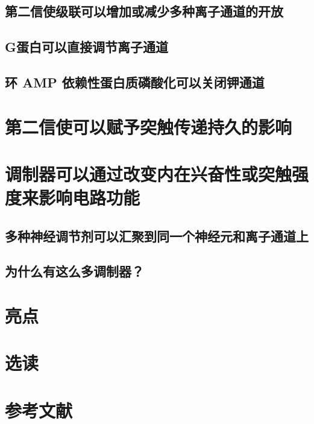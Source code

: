 \subsection{第二信使级联可以增加或减少多种离子通道的开放}
\subsection{G蛋白可以直接调节离子通道}
\subsection{环 AMP 依赖性蛋白质磷酸化可以关闭钾通道}

\section{第二信使可以赋予突触传递持久的影响}

\section{调制器可以通过改变内在兴奋性或突触强度来影响电路功能}
\subsection{多种神经调节剂可以汇聚到同一个神经元和离子通道上}
\subsection{为什么有这么多调制器？}

\section{亮点}

\section{选读}

\section{参考文献}


